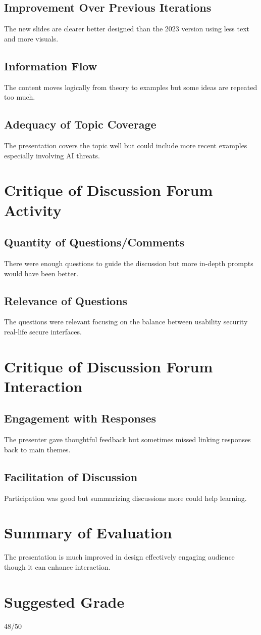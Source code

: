 \documentclass{article}
\begin{document}
\subsection{Improvement Over Previous Iterations}
The new slides are clearer better designed than the 2023 version using less text and more visuals.
\subsection{Information Flow}
The content moves logically from theory to examples but some ideas are repeated too much.
\subsection{Adequacy of Topic Coverage}
The presentation covers the topic well but could include more recent examples especially involving AI threats.

\section{Critique of Discussion Forum Activity}
\subsection{Quantity of Questions/Comments}
There were enough questions to guide the discussion but more in-depth prompts would have been better.
\subsection{Relevance of Questions}
The questions were relevant focusing on the balance between usability security real-life secure interfaces.

\section{Critique of Discussion Forum Interaction}
\subsection{Engagement with Responses}
The presenter gave thoughtful feedback but sometimes missed linking responses back to main themes.
\subsection{Facilitation of Discussion}
Participation was good but summarizing discussions more could help learning.

\section{Summary of Evaluation}
The presentation is much improved in design effectively engaging audience though it can enhance interaction.

\section{Suggested Grade}
48/50
\end{document}
